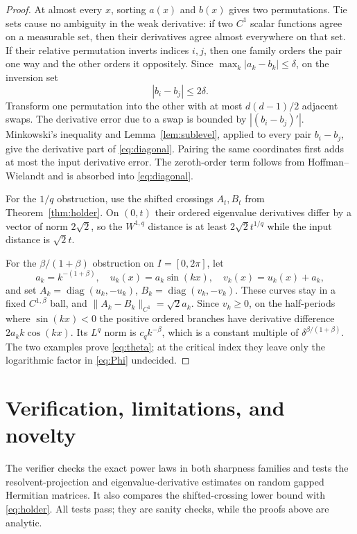 \documentclass[10pt]{article}
\begin{document}
\begin{proof}
At almost every $x$, sorting $a(x)$ and $b(x)$ gives two permutations.
Tie sets cause no ambiguity in the weak derivative: if two $C^1$ scalar
functions agree on a measurable set, then their derivatives agree almost
everywhere on that set.
If their relative permutation inverts indices $i,j$, then one family orders
the pair one way and the other orders it oppositely.  Since
$\max_k|a_k-b_k|\leq\delta$, on the inversion set
\[
 |b_i-b_j|\leq2\delta.
\]
Transform one permutation into the other with at most $d(d-1)/2$ adjacent
swaps.  The derivative error due to a swap is bounded by
$|(b_i-b_j)'|$.  Minkowski's inequality and
Lemma~\ref{lem:sublevel}, applied to every pair $b_i-b_j$, give the derivative
part of \eqref{eq:diagonal}.  Pairing the same coordinates first adds at
most the input derivative error.  The zeroth-order term follows from
Hoffman--Wielandt and is absorbed into \eqref{eq:diagonal}.

For the $1/q$ obstruction, use the shifted crossings $A_t,B_t$ from
Theorem~\ref{thm:holder}.  On $(0,t)$ their ordered eigenvalue derivatives
differ by a vector of norm $2\sqrt2$, so the $W^{1,q}$ distance is at least
$2\sqrt2t^{1/q}$ while the input distance is $\sqrt2t$.

For the $\beta/(1+\beta)$ obstruction on $I=[0,2\pi]$, let
\[
 a_k=k^{-(1+\beta)},\quad u_k(x)=a_k\sin(kx),\quad v_k(x)=u_k(x)+a_k,
\]
and set $A_k=\operatorname{diag}(u_k,-u_k)$,
$B_k=\operatorname{diag}(v_k,-v_k)$.  These curves stay in a fixed
$C^{1,\beta}$ ball, and
$\|A_k-B_k\|_{C^1}=\sqrt2a_k$.  Since $v_k\geq0$, on the half-periods where
$\sin(kx)<0$ the positive ordered branches have derivative difference
$2a_kk\cos(kx)$.  Its $L^q$ norm is $c_qk^{-\beta}$, which is a constant
multiple of $\delta^{\beta/(1+\beta)}$.  The two examples prove
\eqref{eq:theta}; at the critical index they leave only the logarithmic
factor in \eqref{eq:Phi} undecided.
\end{proof}

\section{Verification, limitations, and novelty}

The verifier checks the exact power laws in both sharpness families and
tests the resolvent-projection and eigenvalue-derivative estimates on random
gapped Hermitian matrices.  It also compares the shifted-crossing lower bound
with \eqref{eq:holder}.  All tests pass; they are sanity checks, while the
proofs above are analytic.
\end{document}
